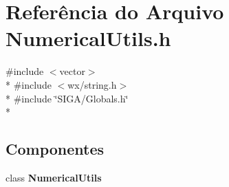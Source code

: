 \section{Referência do Arquivo Numerical\+Utils.\+h}
\label{_numerical_utils_8h}
{\ttfamily \#include $<$vector$>$}\\*
{\ttfamily \#include $<$wx/string.\+h$>$}\\*
{\ttfamily \#include \char`\"{}S\+I\+G\+A/\+Globals.\+h\char`\"{}}\\*
\subsection*{Componentes}
\begin{DoxyCompactItemize}
\item 
class {\bf Numerical\+Utils}
\end{DoxyCompactItemize}
